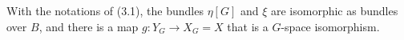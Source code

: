 With the notations of (3.1), the bundles $\eta[G]$ and $\xi$ are isomorphic as bundles over $B$, and there is a map $g: Y_G \rightarrow X_G = X$ that is a $G$-space isomorphism.
